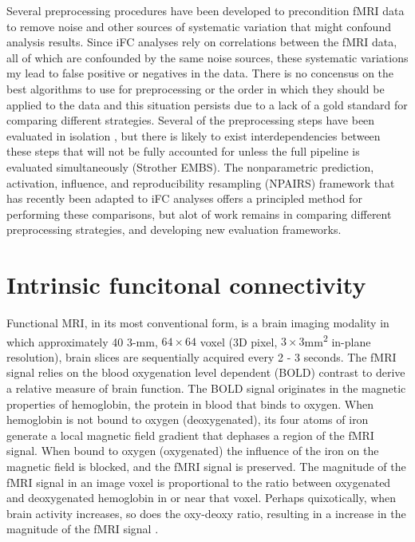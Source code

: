 Several preprocessing procedures have been developed to precondition fMRI data to remove noise and other sources of systematic variation that might confound analysis results. Since iFC analyses rely on correlations between the fMRI data, all of which are confounded by the same noise sources, these systematic variations my lead to false positive or negatives in the data. There is no concensus on the best algorithms to use for preprocessing or the order in which they should be applied to the data and this situation persists due to a lack of a gold standard for comparing different strategies. Several of the preprocessing steps have been evaluated in isolation \cite{Powers, VanDijk, Yan, Yan, Satterthwaite, Satterthwaite, Murphy, Birn, Chang, Saad}, but there is likely to exist interdependencies between these steps that will not be fully accounted for unless the full pipeline is evaluated simultaneously (Strother EMBS). The nonparametric prediction, activation, influence, and reproducibility
resampling (NPAIRS) framework \cite{Strother2002, Laconte2003} that has recently been adapted to iFC analyses \cite{Chu2012, Craddock2013} offers a principled method for performing these comparisons, but alot of work remains in comparing different preprocessing strategies, and developing new evaluation frameworks.





















\section{Intrinsic funcitonal connectivity}

Functional MRI, in its most conventional form, is a brain imaging modality in which approximately 40 3-\si{\milli\meter}, $64 \times 64$ voxel (3D pixel, $3\times3$\si{\milli\meter\squared} in-plane resolution), brain slices are sequentially acquired every 2 - 3 seconds. The fMRI signal relies on the blood oxygenation level dependent (BOLD) contrast to derive a relative measure of brain function. The BOLD signal originates in the magnetic properties of hemoglobin, the protein in blood that binds to oxygen. When hemoglobin is not bound to oxygen (deoxygenated), its four atoms of iron generate a local magnetic field gradient that dephases a region of the fMRI signal. When bound to oxygen (oxygenated) the influence of the iron on the magnetic field is blocked, and the fMRI signal is preserved. The magnitude of the fMRI signal in an image voxel is proportional to the ratio between oxygenated and deoxygenated hemoglobin in or near that voxel. Perhaps quixotically, when brain activity increases, so does the oxy-deoxy ratio, resulting in a increase in the magnitude of the fMRI signal \cite{fmribook}. 

